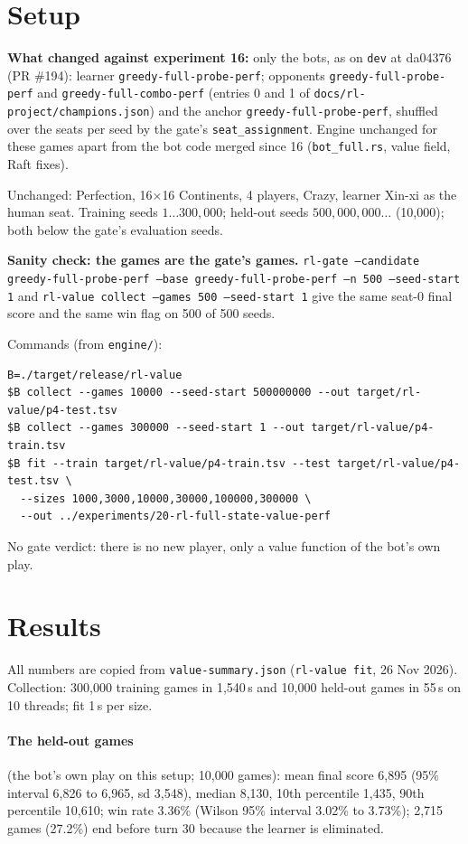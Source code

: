 \documentclass{../polyexp}
\begin{document}
\section{Setup}
\textbf{What changed against experiment 16:} only the bots, as on \texttt{dev} at da04376 (PR \#194): learner
\texttt{greedy-full-probe-perf}; opponents \texttt{greedy-full-probe-perf} and \texttt{greedy-full-combo-perf}
(entries 0 and 1 of \texttt{docs/rl-project/champions.json}) and the anchor \texttt{greedy-full-probe-perf}, shuffled
over the seats per seed by the gate's \texttt{seat\_assignment}. Engine unchanged for these games apart from the
bot code merged since 16 (\texttt{bot\_full.rs}, value field, Raft fixes).

Unchanged: Perfection, 16$\times$16 Continents, 4 players, Crazy, learner Xin-xi as the human seat. Training seeds
$1\dots300{,}000$; held-out seeds $500{,}000{,}000\dots$ (10{,}000); both below the gate's evaluation seeds.

\textbf{Sanity check: the games are the gate's games.} \texttt{rl-gate --candidate greedy-full-probe-perf --base
greedy-full-probe-perf --n 500 --seed-start 1} and \texttt{rl-value collect --games 500 --seed-start 1} give the
same seat-0 final score and the same win flag on 500 of 500 seeds.

Commands (from \texttt{engine/}):
\begin{verbatim}
B=./target/release/rl-value
$B collect --games 10000 --seed-start 500000000 --out target/rl-value/p4-test.tsv
$B collect --games 300000 --seed-start 1 --out target/rl-value/p4-train.tsv
$B fit --train target/rl-value/p4-train.tsv --test target/rl-value/p4-test.tsv \
  --sizes 1000,3000,10000,30000,100000,300000 \
  --out ../experiments/20-rl-full-state-value-perf
\end{verbatim}
No gate verdict: there is no new player, only a value function of the bot's own play.

\section{Results}
\ExpResults

All numbers are copied from \texttt{value-summary.json} (\texttt{rl-value fit}, 26 Nov 2026). Collection: 300{,}000
training games in 1{,}540\,s and 10{,}000 held-out games in 55\,s on 10 threads; fit 1\,s per size.

\paragraph{The held-out games} (the bot's own play on this setup; 10{,}000 games): mean final score 6{,}895
(95\% interval 6{,}826 to 6{,}965, sd 3{,}548), median 8{,}130, 10th percentile 1{,}435, 90th percentile 10{,}610;
win rate 3.36\% (Wilson 95\% interval 3.02\% to 3.73\%); 2{,}715 games (27.2\%) end before turn 30 because the
learner is eliminated.
\end{document}

